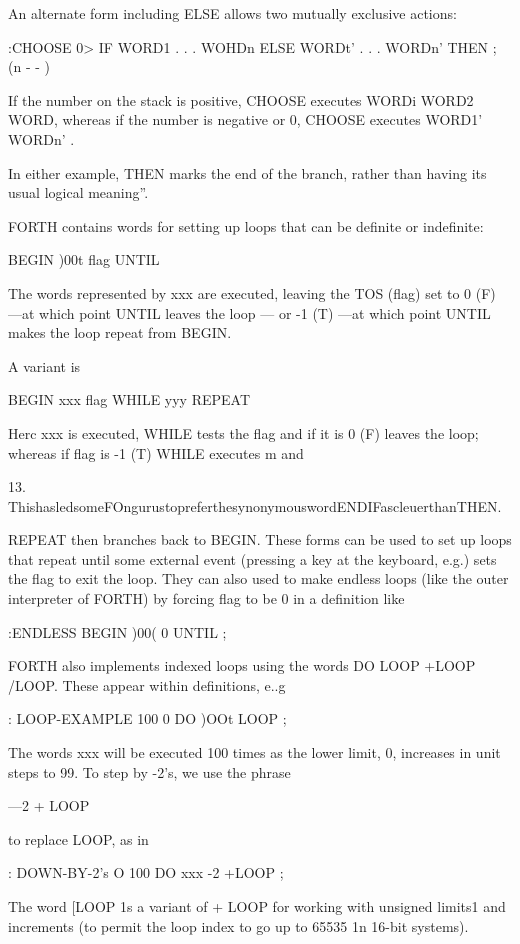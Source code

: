\begin{itemize}
An alternate form including ELSE allows two mutually exclusive
actions:

:CHOOSE 0> IF WORD1 . . . WOHDn
ELSE WORDt' . . . WORDn'
THEN ; (n - - )

If the number on the stack is positive, CHOOSE executes WORDi WORD2 WORD, whereas if the number is negative or 0, CHOOSE executes WORD1' WORDn' .

In either example, THEN marks the end of the branch, rather than having its usual logical meaning”.


FORTH contains words for setting up loops that can be deﬁnite
or indeﬁnite:

BEGIN )00t ﬂag UNTIL

The words represented by xxx are executed, leaving the TOS
(ﬂag) set to 0 (F) —at which point UNTIL leaves the loop — or
-1 (T) —at which point UNTIL makes the loop repeat from
BEGIN.

A variant is

BEGIN xxx ﬂag WHILE yyy REPEAT

Herc xxx is executed, WHILE tests the ﬂag and if it is 0 (F) leaves
the loop; whereas if flag is -1 (T) WHILE executes m and

13. ThishasledsomeFOngurustopreferthesynonymouswordENDIFascleuerthanTHEN.

REPEAT then branches back to BEGIN. These forms can be used to set up loops that repeat until some external event (pressing a key at the keyboard, e.g.) sets the ﬂag to exit the loop. They can also used to make endless loops (like the outer interpreter of FORTH) by forcing flag to be 0 in a deﬁnition like

:ENDLESS BEGIN )00( 0 UNTIL ;

FORTH also implements indexed loops using the words DO LOOP +LOOP /LOOP. These appear within deﬁnitions, e..g

: LOOP-EXAMPLE 100 0 DO )OOt LOOP ;

The words xxx will be executed 100 times as the lower limit, 0, increases in unit steps to 99. To step by -2's, we use the phrase

—2 + LOOP

to replace LOOP, as in

: DOWN-BY-2's O 100 DO xxx -2 +LOOP ;

The word [LOOP 1s a variant of + LOOP for working with unsigned limits1 and increments (to permit the loop index to go up to 65535 1n 16-bit systems).


\end{itemize}
